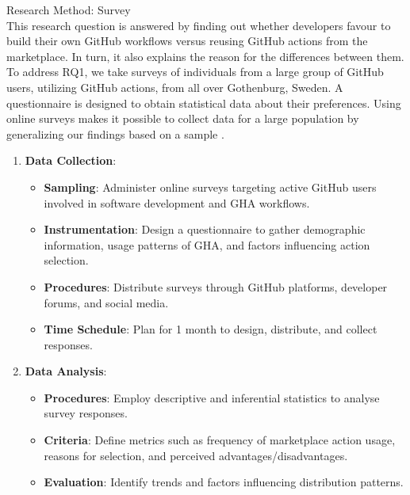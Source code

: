 \documentclass[conference]{IEEEtran}
\begin{document}
Research Method: Survey\\
	
This research question is answered by finding out whether developers favour to build their own GitHub workflows versus reusing GitHub actions from the marketplace. In turn, it also explains the reason for the differences between them.\\

To address RQ1, we take surveys of individuals from a large group of GitHub users, utilizing GitHub actions, from all over Gothenburg, Sweden. A questionnaire is designed to obtain statistical data about their preferences. Using online surveys makes it possible to collect data for a large population by generalizing our findings based on a sample \cite{b19}.\\

\begin{enumerate}
    \item \textbf{Data Collection}:\\
    \begin{itemize}
        \item \textbf{Sampling}: Administer online surveys targeting active GitHub users involved in software development and GHA workflows.
        \item \textbf{Instrumentation}: Design a questionnaire to gather demographic information, usage patterns of GHA, and factors influencing action selection.
        \item \textbf{Procedures}: Distribute surveys through GitHub platforms, developer forums, and social media.
        \item \textbf{Time Schedule}: Plan for 1 month to design, distribute, and collect responses.\\
    \end{itemize}
    
    \item \textbf{Data Analysis}:\\
    \begin{itemize}
        \item \textbf{Procedures}: Employ descriptive and inferential statistics to analyse survey responses.
        \item \textbf{Criteria}: Define metrics such as frequency of marketplace action usage, reasons for selection, and perceived advantages/disadvantages.
        \item \textbf{Evaluation}: Identify trends and factors influencing distribution patterns.\\
    \end{itemize}
\end{enumerate}
\end{document}
